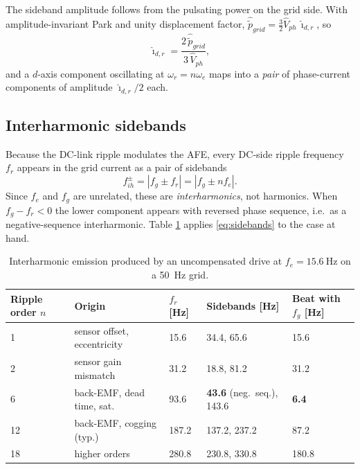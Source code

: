\documentclass[11pt,a4paper]{article}
\begin{document}
The sideband amplitude follows from the pulsating power on the grid side. With
amplitude-invariant Park and unity displacement factor,
$\hat{\tilde{p}}_{grid}=\tfrac{3}{2}\hat{V}_{ph}\,\hat{\imath}_{d,r}$, so
\begin{equation}
\hat{\imath}_{d,r}=\frac{2\,\hat{\tilde{p}}_{grid}}{3\,\hat{V}_{ph}},
\end{equation}
and a $d$-axis component oscillating at $\omega_{r}=n\omega_{e}$ maps into a
\emph{pair} of phase-current components of amplitude $\hat{\imath}_{d,r}/2$ each.

\subsection{Interharmonic sidebands}

Because the DC-link ripple modulates the AFE, every DC-side ripple frequency
$f_{r}$ appears in the grid current as a pair of sidebands
\begin{equation}
f_{ih}^{\pm} = |f_{g} \pm f_{r}| = |f_{g} \pm n f_{e}| .
\label{eq:sidebands}
\end{equation}
Since $f_{e}$ and $f_{g}$ are unrelated, these are \emph{interharmonics}, not
harmonics. When $f_{g}-f_{r}<0$ the lower component appears with reversed phase
sequence, i.e.\ as a negative-sequence interharmonic. Table \ref{tab:ih} applies
\eqref{eq:sidebands} to the case at hand.

\begin{table}[h]
\centering
\small
\footnotesize
\begin{tabular}{lllll}
\toprule
Ripple order $n$ & Origin & $f_{r}$ [Hz] & Sidebands [Hz] & Beat with $f_{g}$ [Hz] \\
\midrule
1  & sensor offset, eccentricity & 15.6  & 34.4, 65.6   & 15.6 \\
2  & sensor gain mismatch        & 31.2  & 18.8, 81.2   & 31.2 \\
6  & back-EMF, dead time, sat. & 93.6  & \textbf{43.6} (neg.\ seq.), 143.6 & \textbf{6.4} \\
12 & back-EMF, cogging (typ.)    & 187.2 & 137.2, 237.2 & 87.2 \\
18 & higher orders               & 280.8 & 230.8, 330.8 & 180.8 \\
\bottomrule
\end{tabular}
\caption{Interharmonic emission produced by an uncompensated drive at
$f_{e}=\SI{15.6}{\hertz}$ on a \SI{50}{\hertz} grid.}
\label{tab:ih}
\end{table}
\end{document}
